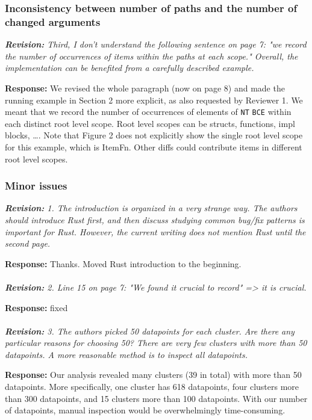 \documentclass{article}
\begin{document}
\subsubsection{Inconsistency between number of paths and the number of changed arguments}

\textit{\textbf{Revision:} Third, I don't understand the following sentence on page 7: "we record the number of occurrences of items within the paths at each scope." Overall, the implementation can be benefited from a carefully described example.}

\textbf{Response:} We revised the whole paragraph (now on page 8) and made the running example in Section 2 more explicit, as also requested by Reviewer 1. We meant that we record the number of occurrences of elements of \verb+NT+ \verb+BCE+ within each distinct root level scope. Root level scopes can be structs, functions, impl blocks, …. Note that Figure 2 does not explicitly show the single root level scope for this example, which is ItemFn. Other diffs could contribute items in different root level scopes. \\

\subsubsection{Minor issues}

\textit{\textbf{Revision:} 1. The introduction is organized in a very strange way. The authors should introduce Rust first, and then discuss studying common bug/fix patterns is important for Rust. However, the current writing does not mention Rust until the second page.}

\textbf{Response:} Thanks. Moved Rust introduction to the beginning. \\ \\

\textit{\textbf{Revision:} 2. Line 15 on page 7: "We found it crucial to record" => it is crucial.}

\textbf{Response:} fixed \\ \\

\textit{\textbf{Revision:} 3. The authors picked 50 datapoints for each cluster. Are there any particular reasons for choosing 50? There are very few clusters with more than 50 datapoints. A more reasonable method is to inspect all datapoints.}

\textbf{Response:} Our analysis revealed many clusters (39 in total) with more than 50 datapoints. More specifically, one cluster has 618 datapoints, four clusters more than 300 datapoints, and 15 clusters more than 100 datapoints. With our number of datapoints, manual inspection would be overwhelmingly time-consuming.
\end{document}
